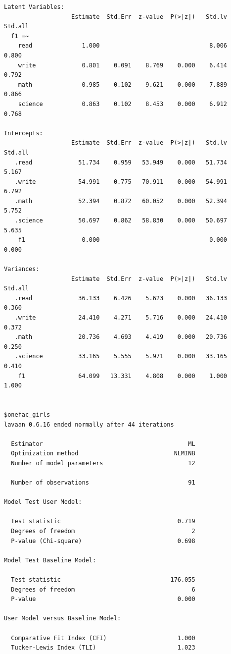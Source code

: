 \documentclass[
  letterpaper,
  DIV=11,
  numbers=noendperiod]{scrreprt}
\begin{document}
\begin{verbatim}
Latent Variables:
                   Estimate  Std.Err  z-value  P(>|z|)   Std.lv  Std.all
  f1 =~                                                                 
    read              1.000                               8.006    0.800
    write             0.801    0.091    8.769    0.000    6.414    0.792
    math              0.985    0.102    9.621    0.000    7.889    0.866
    science           0.863    0.102    8.453    0.000    6.912    0.768

Intercepts:
                   Estimate  Std.Err  z-value  P(>|z|)   Std.lv  Std.all
   .read             51.734    0.959   53.949    0.000   51.734    5.167
   .write            54.991    0.775   70.911    0.000   54.991    6.792
   .math             52.394    0.872   60.052    0.000   52.394    5.752
   .science          50.697    0.862   58.830    0.000   50.697    5.635
    f1                0.000                               0.000    0.000

Variances:
                   Estimate  Std.Err  z-value  P(>|z|)   Std.lv  Std.all
   .read             36.133    6.426    5.623    0.000   36.133    0.360
   .write            24.410    4.271    5.716    0.000   24.410    0.372
   .math             20.736    4.693    4.419    0.000   20.736    0.250
   .science          33.165    5.555    5.971    0.000   33.165    0.410
    f1               64.099   13.331    4.808    0.000    1.000    1.000


$onefac_girls
lavaan 0.6.16 ended normally after 44 iterations

  Estimator                                         ML
  Optimization method                           NLMINB
  Number of model parameters                        12

  Number of observations                            91

Model Test User Model:
                                                      
  Test statistic                                 0.719
  Degrees of freedom                                 2
  P-value (Chi-square)                           0.698

Model Test Baseline Model:

  Test statistic                               176.055
  Degrees of freedom                                 6
  P-value                                        0.000

User Model versus Baseline Model:

  Comparative Fit Index (CFI)                    1.000
  Tucker-Lewis Index (TLI)                       1.023


\end{verbatim}
\end{document}
